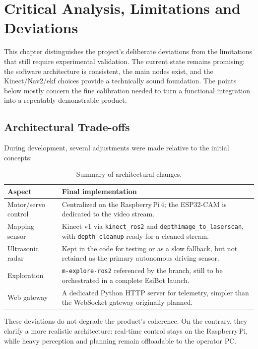 \chapter{Critical Analysis, Limitations and Deviations}
\label{ch:limitations}

This chapter distinguishes the project's deliberate deviations from the limitations that
still require experimental validation. The current state remains promising: the software
architecture is consistent, the main nodes exist, and the Kinect/Nav2/\gls{ekf} choices
provide a technically sound foundation. The points below mostly concern the fine
calibration needed to turn a functional integration into a repeatably demonstrable
product.

\section{Architectural Trade-offs}
\label{sec:lim_archi}

During development, several adjustments were made relative to the initial concepts:

\begin{table}[H]
	\centering
	\caption{Summary of architectural changes.}
	\label{tab:ecarts_archi}
	\renewcommand{\arraystretch}{1.3}
	\begin{tabularx}{\linewidth}{L{3.8cm} L{8.4cm}}
		\toprule
		\textbf{Aspect} & \textbf{Final implementation} \\
		\midrule
		Motor/servo control & Centralized on the Raspberry\,Pi\,4; the ESP32-CAM is dedicated to the video stream.\\
		Mapping sensor & Kinect v1 via \texttt{kinect\_ros2} and \texttt{depthimage\_to\_laserscan}, with \texttt{depth\_cleanup} ready for a cleaned stream.\\
		Ultrasonic radar & Kept in the code for testing or as a slow fallback, but not retained as the primary autonomous driving sensor.\\
		Exploration & \texttt{m-explore-ros2} referenced by the branch, still to be orchestrated in a complete EsiBot launch.\\
		Web gateway & A dedicated Python HTTP server for telemetry, simpler than the WebSocket gateway originally planned.\\
		\bottomrule
	\end{tabularx}
\end{table}

These deviations do not degrade the product's coherence. On the contrary, they clarify a
more realistic architecture: real-time control stays on the Raspberry\,Pi, while heavy
perception and planning remain offloadable to the operator PC.

